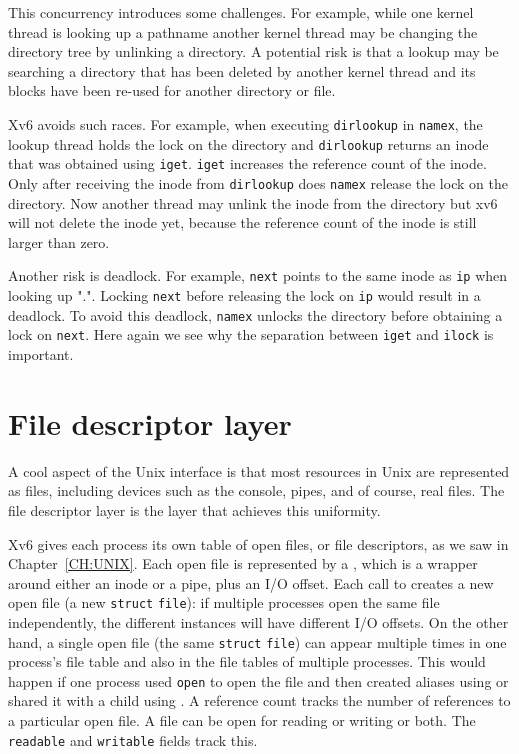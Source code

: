 This concurrency introduces some challenges. For example, while one kernel
thread is looking up a pathname another kernel thread may be changing the
directory tree by unlinking a directory.  A potential risk is that a lookup
may be searching a directory that has been deleted by another kernel thread and
its blocks have been re-used for another directory or file.

Xv6 avoids such races.  For example, when executing
\lstinline{dirlookup}
in
\lstinline{namex},
the lookup thread holds the lock on the directory and
\lstinline{dirlookup}
returns an inode that was obtained using
\lstinline{iget}.
\lstinline{iget}
increases the reference count of the inode.  Only after receiving the
inode from
\lstinline{dirlookup}
does
\lstinline{namex}
release the lock on the directory.  Now another thread may unlink the inode from
the directory but xv6 will not delete the inode yet, because the reference count
of the inode is still larger than zero.

Another risk is deadlock.  For example,
\lstinline{next}
points to the same inode as
\lstinline{ip}
when looking up ".".
Locking
\lstinline{next}
before releasing the lock on
\lstinline{ip}
would result in a deadlock.
To avoid this deadlock,
\lstinline{namex}
unlocks the directory before obtaining a lock on
\lstinline{next}.
Here again we see why the separation between
\lstinline{iget}
and
\lstinline{ilock}
is important.
\section{File descriptor layer}

A cool aspect of the Unix interface is that most resources in Unix are
represented as files, including devices such as the console, pipes, and of
course, real files.  The file descriptor layer is the layer that achieves this
uniformity.

Xv6 gives each process its own table of open files, or
file descriptors, as we saw in
Chapter~\ref{CH:UNIX}.
Each open file is represented by a
,
which is a wrapper around either an inode or a pipe,
plus an I/O offset.
Each call to 
creates a new open file (a new
\lstinline{struct}
\lstinline{file}):
if multiple processes open the same file independently,
the different instances will have different I/O offsets.
On the other hand, a single open file
(the same
\lstinline{struct}
\lstinline{file})
can appear
multiple times in one process's file table
and also in the file tables of multiple processes.
This would happen if one process used
\lstinline{open}
to open the file and then created aliases using
or shared it with a child using
.
A reference count tracks the number of references to
a particular open file.
A file can be open for reading or writing or both.
The
\lstinline{readable}
and
\lstinline{writable}
fields track this.

